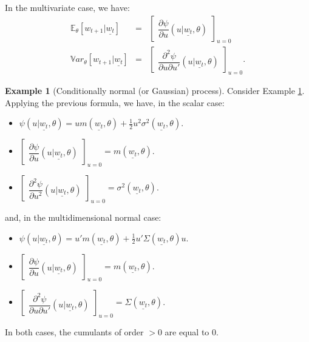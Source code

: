 \documentclass[
  12pt,
]{book}
\providecommand{\tightlist}{%
  \setlength{\itemsep}{0pt}\setlength{\parskip}{0pt}}
\theoremstyle{definition}
\theoremstyle{definition}
\newtheorem{example}{Example}[chapter]
\theoremstyle{definition}
\theoremstyle{definition}
\theoremstyle{remark}
\begin{document}
In the multivariate case, we have:
\begin{eqnarray*}
\mathbb{E}_{\theta}[w_{t+1}|\underline{w_t}] &=& \left[\begin{array}{l}  \dfrac{\partial \psi}{\partial
u} (u|\underline{w_t},\theta)  \end{array} \right]_{u=0} \\
\mathbb{V}ar_{\theta}[w_{t+1}|\underline{w_t}] &=& \left[\begin{array}{l}  \dfrac{\partial^2
\psi}{\partial u\partial u'} (u|\underline{w_t},\theta)  \end{array}
\right]_{u=0}.
\end{eqnarray*}

\begin{example}[Conditionally normal (or Gaussian) process]
\protect\hypertarget{exm:exGaussian}{}\label{exm:exGaussian}Consider Example \ref{exm:exGaussian}. Applying the previous formula, we have, in the scalar case:

\begin{itemize}
\tightlist
\item
  \(\psi(u|\underline{w_t},\theta)=u m(\underline{w_t},\theta) + \frac{1}{2}u^2\sigma^2(\underline{w_t},\theta)\).
\item
  \(\left[\begin{array}{l} \dfrac{\partial \psi}{\partial u} (u|\underline{w_t},\theta) \end{array} \right]_{u=0} = m(\underline{w_t},\theta)\).
\item
  \(\left[\begin{array}{l} \dfrac{\partial^2 \psi}{\partial u^2} (u|\underline{w_t},\theta) \end{array} \right]_{u=0} = \sigma^2(\underline{w_t},\theta)\).
\end{itemize}

and, in the multidimensional normal case:

\begin{itemize}
\tightlist
\item
  \(\psi(u|\underline{w_t},\theta)=u' m(\underline{w_t},\theta) + \frac{1}{2}u'\Sigma(\underline{w_t},\theta)u\).
\item
  \(\left[\begin{array}{l} \dfrac{\partial \psi}{\partial u} (u|\underline{w_t},\theta) \end{array} \right]_{u=0} = m(\underline{w_t},\theta)\).
\item
  \(\left[\begin{array}{l} \dfrac{\partial^2 \psi}{\partial u\partial u'} (u|\underline{w_t},\theta) \end{array} \right]_{u=0} = \Sigma(\underline{w_t},\theta)\).
\end{itemize}

In both cases, the cumulants of order \(>0\) are equal to \(0\).
\end{example}
\end{document}

